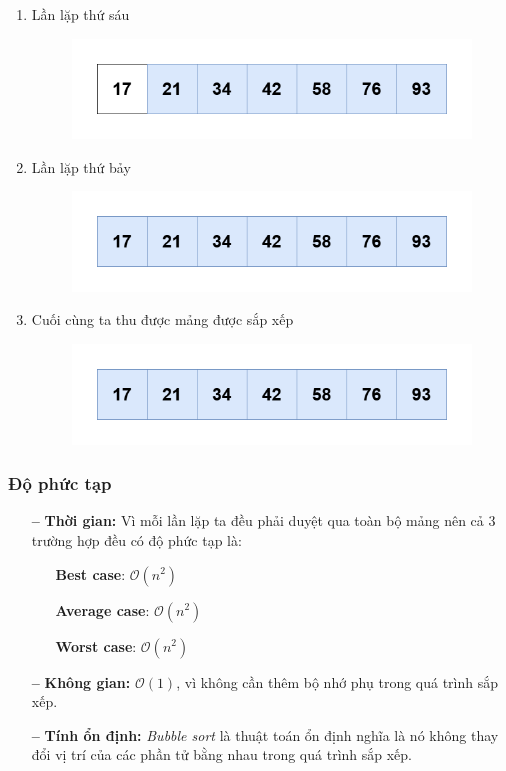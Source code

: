 \begin{enumerate}
    \item Lần lặp thứ sáu
    \begin{figure}[H]
        \centering
        \includegraphics[width=0.75\linewidth]{img/bubble_sort/27.png}
    \end{figure}

    \item Lần lặp thứ bảy
    \begin{figure}[H]
        \centering
        \includegraphics[width=0.75\linewidth]{img/bubble_sort/28.png}
    \end{figure}

    \item Cuối cùng ta thu được mảng được sắp xếp
    \begin{figure}[H]
        \centering
        \includegraphics[width=0.75\linewidth]{img/bubble_sort/28.png}
    \end{figure}
\end{enumerate}
\newpage
\subsubsection{Độ phức tạp}

\begin{itemize}
    \item[\textbf{--}]\textbf{Thời gian:} Vì mỗi lần lặp ta đều phải duyệt qua toàn bộ mảng nên cả 3 trường hợp đều có độ phức tạp là:
        \begin{itemize}
            \item[\textbullet]\textbf{Best case}: $\mathcal{O}(n^2)$
            \item[\textbullet]\textbf{Average case}:  $\mathcal{O}(n^2)$
            \item[\textbullet]\textbf{Worst case}:  $\mathcal{O}(n^2)$
        \end{itemize}
    \item[\textbf{--}]\textbf{Không gian:}  $\mathcal{O}(1)$, vì không cần thêm bộ nhớ phụ trong quá trình sắp xếp.
    \item[\textbf{--}]\textbf{Tính ổn định:} \textit{Bubble sort} là thuật toán ổn định nghĩa là nó không thay đổi vị trí của các phần tử bằng nhau trong quá trình sắp xếp.
\end{itemize}